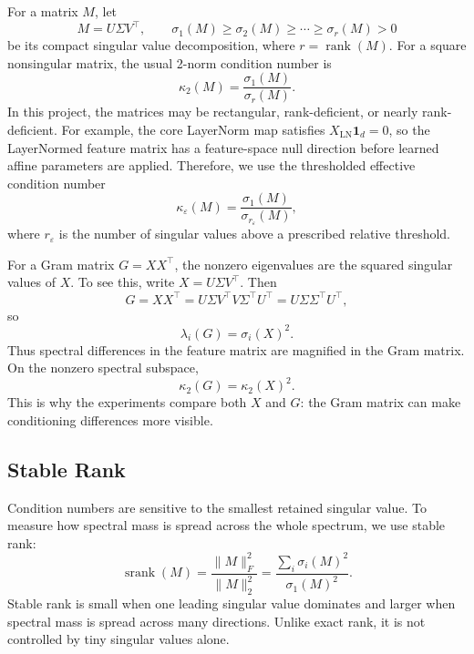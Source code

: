 \documentclass[11pt]{article}
\newcommand{\one}{\mathbf{1}}
\newcommand{\LN}{\operatorname{LN}}
\newcommand{\rank}{\operatorname{rank}}
\newcommand{\srank}{\operatorname{srank}}
\newcommand{\kappaeff}{\kappa_{\varepsilon}}
\begin{document}
For a matrix \(M\), let
\[
    M=U\Sigma V^\top,
    \qquad
    \sigma_1(M)\geq \sigma_2(M)\geq \cdots \geq \sigma_r(M)>0
\]
be its compact singular value decomposition, where \(r=\rank(M)\). For a square nonsingular matrix, the usual 2-norm condition number is
\[
    \kappa_2(M)=\frac{\sigma_1(M)}{\sigma_r(M)}.
\]
In this project, the matrices may be rectangular, rank-deficient, or nearly rank-deficient. For example, the core LayerNorm map satisfies \(X_{\LN}\one_d=0\), so the LayerNormed feature matrix has a feature-space null direction before learned affine parameters are applied. Therefore, we use the thresholded effective condition number
\begin{equation}
    \kappaeff(M)
    =
    \frac{\sigma_1(M)}{\sigma_{r_\varepsilon}(M)},
\label{eq:effective-condition-number}
\end{equation}
where \(r_\varepsilon\) is the number of singular values above a prescribed relative threshold.

For a Gram matrix \(G=XX^\top\), the nonzero eigenvalues are the squared singular values of \(X\). To see this, write \(X=U\Sigma V^\top\). Then
\[
    G=XX^\top
    =
    U\Sigma V^\top V\Sigma^\top U^\top
    =
    U\Sigma\Sigma^\top U^\top,
\]
so
\begin{equation}
    \lambda_i(G)=\sigma_i(X)^2.
\label{eq:gram-eigenvalues}
\end{equation}
Thus spectral differences in the feature matrix are magnified in the Gram matrix. On the nonzero spectral subspace,
\[
    \kappa_2(G)=\kappa_2(X)^2.
\]
This is why the experiments compare both \(X\) and \(G\): the Gram matrix can make conditioning differences more visible.

\subsection{Stable Rank}

Condition numbers are sensitive to the smallest retained singular value. To measure how spectral mass is spread across the whole spectrum, we use stable rank:
\begin{equation}
    \srank(M)
    =
    \frac{\|M\|_F^2}{\|M\|_2^2}
    =
    \frac{\sum_i \sigma_i(M)^2}{\sigma_1(M)^2}.
\label{eq:stable-rank}
\end{equation}
Stable rank is small when one leading singular value dominates and larger when spectral mass is spread across many directions. Unlike exact rank, it is not controlled by tiny singular values alone.
\end{document}
